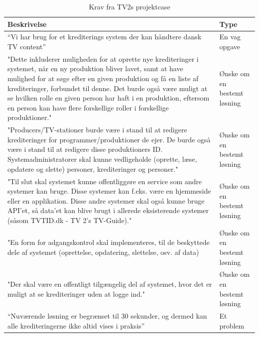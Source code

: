 \begin{table}[ht]
    \begin{tabularx}{\textwidth}{|p{10cm}|X|}
        \hline
        \textbf{Beskrivelse} & \textbf{Type} \\
        \hline
        “Vi har brug for  et krediterings system der kan  håndtere  dansk TV content” 
        & En vag opgave \\
        
        \hline
        "Dette inkluderer muligheden for at oprette nye krediteringer i systemet, når en ny produktion bliver lavet, samt at have mulighed for at søge efter en given produktion og få en liste af krediteringer, forbundet til denne. Det burde også være muligt at se hvilken rolle en given person har haft i en produktion, eftersom en person kan have flere forskellige roller i forskellige produktioner."
        & Ønske om en bestemt løsning \\
        
        \hline 
        "Producers/TV-stationer burde være i stand til at redigere krediteringer for programmer/produktioner de ejer. De burde også være i stand til at redigere disse produktioners ID. Systemadministratorer skal kunne vedligeholde (oprette, læse, opdatere og slette) personer, krediteringer og personer."
        & Ønske om en bestemt løsning \\
        
        \hline
        "Til slut skal systemet kunne offentliggøre en service som andre systemer kan bruge. Disse systemer kan f.eks. være en hjemmeside eller en applikation. Disse andre systemer skal også kunne bruge API'et, så data'et kan blive brugt i allerede eksisterende systemer (såsom TVTID.dk - TV 2's TV-Guide)."
        & Ønske om en bestemt løsning \\
        
        \hline
        "En form for adgangskontrol skal implementeres, til de beskyttede dele af systemet (oprettelse, opdatering, slettelse, osv. af data)
        & Ønske om en bestemt løsning \\
        
        \hline
        "Der skal være en offentligt tilgængelig del af systemet, hvor det er muligt at se krediteringer uden at logge ind."
        & Ønske om en bestemt løsning \\
        
        \hline
        “Nuværende løsning er begrænset til 30 sekunder, og dermed kan alle krediteringerne ikke altid vises i praksis” 
        & Et problem \\
        \hline
    \end{tabularx}    
    \caption{Krav fra TV2s projektcase}
    \label{table:kravFraCase}
\end{table}


